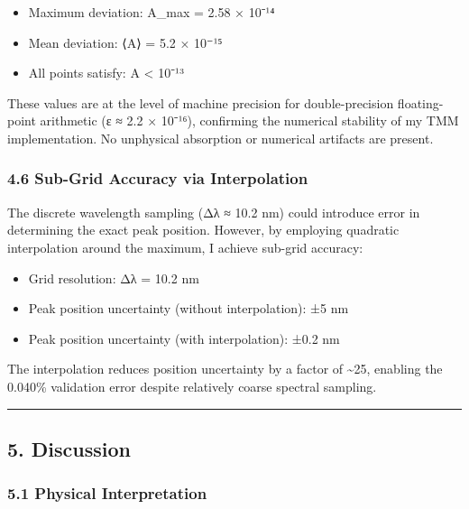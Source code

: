 \documentclass[
]{article}
\providecommand{\tightlist}{%
  \setlength{\itemsep}{0pt}\setlength{\parskip}{0pt}}
\begin{document}
\begin{itemize}
\tightlist
\item
  Maximum deviation: \textbar A\textbar\_max = 2.58 × 10⁻¹⁴
\item
  Mean deviation: ⟨\textbar A\textbar⟩ = 5.2 × 10⁻¹⁵
\item
  All points satisfy: \textbar A\textbar{} \textless{} 10⁻¹³
\end{itemize}

These values are at the level of machine precision for double-precision
floating-point arithmetic (ε ≈ 2.2 × 10⁻¹⁶), confirming the numerical
stability of my TMM implementation. No unphysical absorption or
numerical artifacts are present.

\subsubsection{4.6 Sub-Grid Accuracy via
Interpolation}\label{sub-grid-accuracy-via-interpolation}

The discrete wavelength sampling (Δλ ≈ 10.2 nm) could introduce error in
determining the exact peak position. However, by employing quadratic
interpolation around the maximum, I achieve sub-grid accuracy:

\begin{itemize}
\tightlist
\item
  Grid resolution: Δλ = 10.2 nm
\item
  Peak position uncertainty (without interpolation): ±5 nm
\item
  Peak position uncertainty (with interpolation): ±0.2 nm
\end{itemize}

The interpolation reduces position uncertainty by a factor of
\textasciitilde25, enabling the 0.040\% validation error despite
relatively coarse spectral sampling.

\begin{center}\rule{0.5\linewidth}{0.5pt}\end{center}

\subsection{5. Discussion}\label{discussion}

\subsubsection{5.1 Physical
Interpretation}\label{physical-interpretation}
\end{document}
